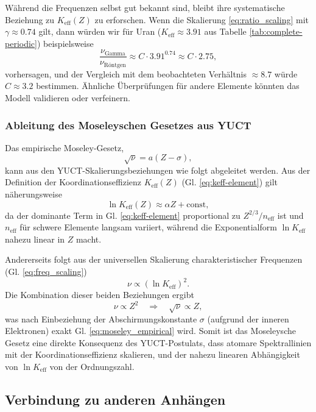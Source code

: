 \documentclass[12pt,a4paper]{article}
\begin{document}
	Während die Frequenzen selbst gut bekannt sind, bleibt ihre systematische Beziehung zu \(K_{\mathrm{eff}}(Z)\) zu erforschen. Wenn die Skalierung \eqref{eq:ratio_scaling} mit \(\gamma \approx 0.74\) gilt, dann würden wir für Uran (\(K_{\mathrm{eff}}\approx 3.91\) aus Tabelle \ref{tab:complete-periodic}) beispielsweise
	\[
	\frac{\nu_{\text{Gamma}}}{\nu_{\text{Röntgen}}} \approx C \cdot 3.91^{0.74} \approx C \cdot 2.75,
	\]
	vorhersagen, und der Vergleich mit dem beobachteten Verhältnis \(\approx 8.7\) würde \(C \approx 3.2\) bestimmen. Ähnliche Überprüfungen für andere Elemente könnten das Modell validieren oder verfeinern.
	
	\subsubsection{Ableitung des Moseleyschen Gesetzes aus YUCT}
	\label{sec:moseley_derivation}
	
	Das empirische Moseley-Gesetz,
	\begin{equation}
		\sqrt{\nu} = a (Z - \sigma),
		\label{eq:moseley_empirical}
	\end{equation}
	kann aus den YUCT-Skalierungsbeziehungen wie folgt abgeleitet werden. Aus der Definition der Koordinationseffizienz \(K_{\mathrm{eff}}(Z)\) (Gl. \ref{eq:keff-element}) gilt näherungsweise
	\[
	\ln K_{\mathrm{eff}}(Z) \approx \alpha Z + \text{const},
	\]
	da der dominante Term in Gl. \ref{eq:keff-element} proportional zu \(Z^{2/3}/n_{\mathrm{eff}}\) ist und \(n_{\mathrm{eff}}\) für schwere Elemente langsam variiert, während die Exponentialform \(\ln K_{\mathrm{eff}}\) nahezu linear in \(Z\) macht.
	
	Andererseits folgt aus der universellen Skalierung charakteristischer Frequenzen (Gl. \ref{eq:freq_scaling})
	\[
	\nu \propto (\ln K_{\mathrm{eff}})^2.
	\]
	Die Kombination dieser beiden Beziehungen ergibt
	\[
	\nu \propto Z^2 \quad \Longrightarrow \quad \sqrt{\nu} \propto Z,
	\]
	was nach Einbeziehung der Abschirmungskonstante \(\sigma\) (aufgrund der inneren Elektronen) exakt Gl. \ref{eq:moseley_empirical} wird. Somit ist das Moseleysche Gesetz eine direkte Konsequenz des YUCT-Postulats, dass atomare Spektrallinien mit der Koordinationseffizienz skalieren, und der nahezu linearen Abhängigkeit von \(\ln K_{\mathrm{eff}}\) von der Ordnungszahl.
	
	\subsection{Verbindung zu anderen Anhängen}
	
\end{document}
